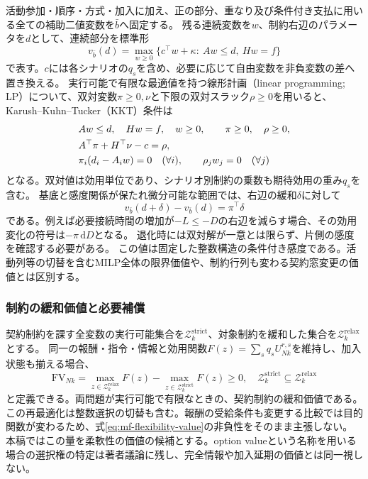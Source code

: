 活動参加・順序・方式・加入に加え、正の部分、重なり及び条件付き支払に用いる全ての補助二値変数を$\bar b$へ固定する。
残る連続変数を$w$、制約右辺のパラメータを$d$として、連続部分を標準形
\begin{equation}
 v_{\bar b}(d)=\max_{w\ge0}\{c^\top w+\kappa:\ Aw\le d,\ Hw=f\}
 \label{eq:mf-fixed-lp}
\end{equation}
で表す。$c$には各シナリオの$q_s$を含め、必要に応じて自由変数を非負変数の差へ置き換える。
実行可能で有限な最適値を持つ線形計画（linear programming; LP）について、双対変数$\pi\ge0,\nu$と下限の双対スラック$\rho\ge0$を用いると、Karush--Kuhn--Tucker（KKT）条件は
\begin{align}
 &Aw\le d,\quad Hw=f,\quad w\ge0,\qquad
 \pi\ge0,\quad \rho\ge0,\notag\\
 &A^\top\pi+H^\top\nu-c=\rho,\notag\\
 &\pi_i(d_i-A_iw)=0\quad(\forall i),\qquad
 \rho_jw_j=0\quad(\forall j)
 \label{eq:mf-kkt}
\end{align}
となる。双対値は効用単位であり、シナリオ別制約の乗数も期待効用の重み$q_s$を含む。
基底と感度関係が保たれ微分可能な範囲では、右辺の緩和$\delta$に対して
\begin{equation}
 v_{\bar b}(d+\delta)-v_{\bar b}(d)=\pi^\top\delta
 \label{eq:mf-local-value}
\end{equation}
である。例えば必要接続時間の増加が$-L\le-D$の右辺を減らす場合、その効用変化の符号は$-\pi\,\mathrm dD$となる。
退化時には双対解が一意とは限らず、片側の感度を確認する必要がある。
この値は固定した整数構造の条件付き感度である。活動列等の切替を含むMILP全体の限界価値や、制約行列も変わる契約窓変更の価値とは区別する。

\subsubsection{制約の緩和価値と必要補償}

契約制約を課す全変数の実行可能集合を$\mathcal Z_k^{\mathrm{strict}}$、対象制約を緩和した集合を$\mathcal Z_k^{\mathrm{relax}}$とする。
同一の報酬・指令・情報と効用関数$F(z)=\sum_s q_sU_{Nk}^{r,s}$を維持し、加入状態も揃える場合、
\begin{equation}
 \mathrm{FV}_{Nk}
 =\max_{z\in\mathcal Z_k^{\mathrm{relax}}}F(z)
  -\max_{z\in\mathcal Z_k^{\mathrm{strict}}}F(z)\ge0,
 \quad\mathcal Z_k^{\mathrm{strict}}\subseteq\mathcal Z_k^{\mathrm{relax}}
 \label{eq:mf-flexibility-value}
\end{equation}
と定義できる。両問題が実行可能で有限なときの、契約制約の緩和価値である。
この再最適化は整数選択の切替も含む。報酬の受給条件も変更する比較では目的関数が変わるため、式\eqref{eq:mf-flexibility-value}の非負性をそのまま主張しない。
本稿ではこの量を柔軟性の価値の候補とする。option valueという名称を用いる場合の選択権の特定は著者議論に残し、完全情報や加入延期の価値とは同一視しない。

